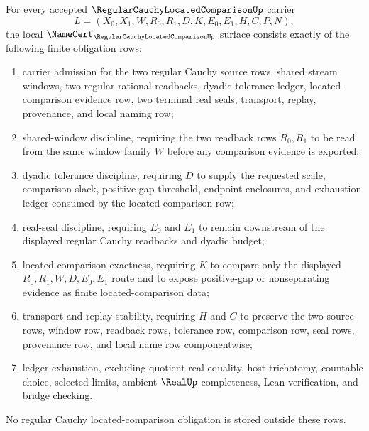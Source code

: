\begin{theorem}
\label{thm:regular-cauchy-located-comparison-namecert-obligations}
For every accepted $\RegularCauchyLocatedComparisonUp$ carrier
$$
L=(X_0,X_1,W,R_0,R_1,D,K,E_0,E_1,H,C,P,N),
$$
the local $\NameCert_{\RegularCauchyLocatedComparisonUp}$ surface consists exactly of the following finite obligation rows:
\begin{enumerate}
\item carrier admission for the two regular Cauchy source rows, shared stream windows, two regular rational readbacks, dyadic tolerance ledger, located-comparison evidence row, two terminal real seals, transport, replay, provenance, and local naming row;
\item shared-window discipline, requiring the two readback rows $R_0,R_1$ to be read from the same window family $W$ before any comparison evidence is exported;
\item dyadic tolerance discipline, requiring $D$ to supply the requested scale, comparison slack, positive-gap threshold, endpoint enclosures, and exhaustion ledger consumed by the located comparison row;
\item real-seal discipline, requiring $E_0$ and $E_1$ to remain downstream of the displayed regular Cauchy readbacks and dyadic budget;
\item located-comparison exactness, requiring $K$ to compare only the displayed $R_0,R_1,W,D,E_0,E_1$ route and to expose positive-gap or nonseparating evidence as finite located-comparison data;
\item transport and replay stability, requiring $H$ and $C$ to preserve the two source rows, window row, readback rows, tolerance row, comparison row, seal rows, provenance row, and local name row componentwise;
\item ledger exhaustion, excluding quotient real equality, host trichotomy, countable choice, selected limits, ambient $\RealUp$ completeness, Lean verification, and bridge checking.
\end{enumerate}
No regular Cauchy located-comparison obligation is stored outside these rows.
\end{theorem}
